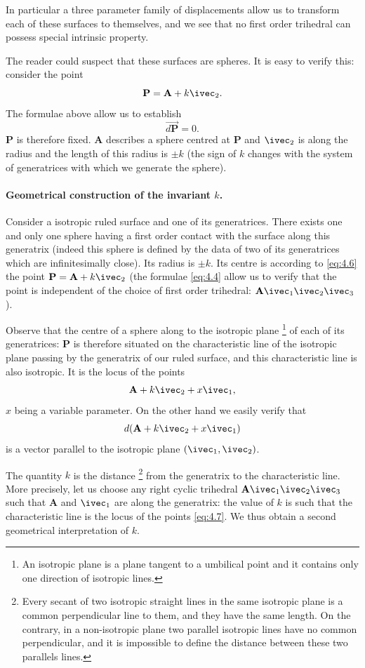 In particular a three parameter family of displacements allow us to transform each of these surfaces to themselves, and we see that no first order trihedral can possess special intrinsic property.

The reader could suspect that these surfaces are spheres. It is easy to verify this: consider the point
\begin{equation}
  \label{eq:4.6}
  \mathbf{P}=\mathbf{A}+k\ivec_{2}.
\end{equation}
The formulae above allow us to establish
\[
\overrightarrow{d\mathbf{P}}=0.
\]
$\mathbf{P}$ is therefore fixed. $\mathbf{A}$ describes a sphere centred at $\mathbf{P}$ and $\ivec_{2}$ is along the radius and the length of this radius is $\pm k$ (the sign of $k$ changes with the system of generatrices with which we generate the sphere).

\paragraph{Geometrical construction of the invariant $k$.}
\label{sec:52}

Consider a isotropic ruled surface and one of its generatrices. There exists one and only one sphere having a first order contact with the surface along this generatrix (indeed this sphere is defined by the data of two of its generatrices which are infinitesimally close). Its radius is $\pm k$. Its centre is according to \eqref{eq:4.6} the point $\mathbf{P}=\mathbf{A}+k\ivec_{2}$ (the formulae \eqref{eq:4.4} allow us to verify that the point is independent of the choice of first order trihedral: $\mathbf{A}\ivec_{1}\ivec_{2}\ivec_{3}$).

Observe that the centre of a sphere along to the isotropic plane \footnote{An isotropic plane is a plane tangent to a umbilical point and it contains only one direction of isotropic lines.} of each of its generatrices: $\mathbf{P}$ is therefore situated on the characteristic line of the isotropic plane passing by the generatrix of our ruled surface, and this characteristic line is also isotropic. It is the locus of the points
\begin{equation}
  \label{eq:4.7}
  \mathbf{A}+k\ivec_{2}+x\ivec_{1},
\end{equation}
$x$ being a variable parameter. On the other hand we easily verify that
\[
d(\mathbf{A}+k\ivec_{2}+x\ivec_{1})
\]
is a vector parallel to the isotropic plane $(\ivec_{1},\ivec_{2})$.

The quantity $k$ is the distance \footnote{Every secant of two isotropic straight lines in the same isotropic plane is a common perpendicular line to them, and they have the same length. On the contrary, in a non-isotropic plane two parallel isotropic lines have no common perpendicular, and it is impossible to define the distance between these two parallels lines.} from the generatrix to the characteristic line. More precisely, let us choose any right cyclic trihedral $\mathbf{A}\ivec_{1}\ivec_{2}\ivec_{3}$ such that $\mathbf{A}$ and $\ivec_{1}$ are along the generatrix: the value of $k$ is such that the characteristic line is the locus of the points \eqref{eq:4.7}. We thus obtain a second geometrical interpretation of $k$.

